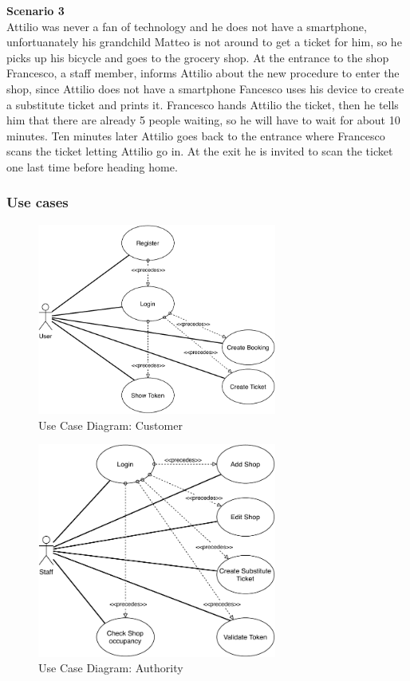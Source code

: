 \textbf{Scenario 3}\\
Attilio was never a fan of technology and he does not have a smartphone, unfortuanately his grandchild Matteo is not around to get a ticket for him, so he picks up his bicycle and goes to the grocery shop. At the entrance to the shop Francesco, a staff member, informs Attilio about the new procedure to enter the shop, since Attilio does not have a smartphone Fancesco uses his device to create a substitute ticket and prints it. Francesco hands Attilio the ticket, then he tells him that there are already 5 people waiting, so he will have to wait for about 10 minutes. Ten minutes later Attilio goes back to the entrance where Francesco scans the ticket letting Attilio go in. At the exit he is invited to scan the ticket one last time before heading home.

\subsubsection{Use cases}

\begin{figure}[H]
    \centering
    \includegraphics[width=0.7\textwidth]{Images/usecasediagram-user.pdf}
    \caption{Use Case Diagram: Customer}
\end{figure}
\begin{figure}[H]
    \centering
    \includegraphics[width=0.7\textwidth]{Images/usecasediagram-staff.pdf}
    \caption{Use Case Diagram: Authority}
\end{figure}

